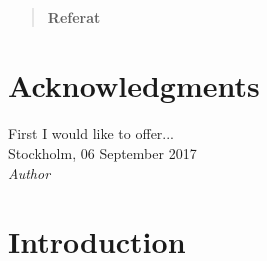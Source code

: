 \documentclass[11pt,a4paper,abstractoff,titlepage,final,parskip=half*,BCOR10mm,appendixprefix=true]{scrreprt}%
\begin{document}
\renewcommand\abstractname{Referat}

\begin{abstract}

\subsubsection*{\centering\abstractname}



\end{abstract}




\chapter*{Acknowledgments}

First I would like to offer...\\

Stockholm, 06 September 2017\\
\textit{Author}








%
\tableofcontents
\listoffigures








\cleardoublepage


\chapter{Introduction}
\label{chap_Intro}
\end{document}
